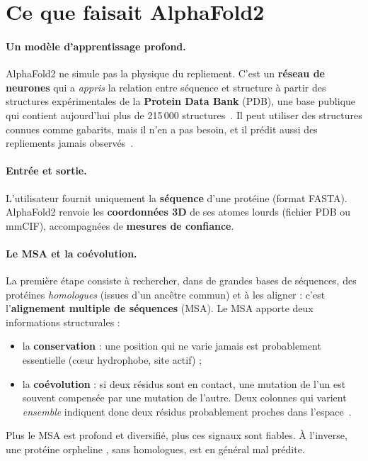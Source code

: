\section{Ce que faisait AlphaFold2}

\paragraph{Un modèle d'apprentissage profond.} AlphaFold2 ne simule pas la physique du repliement. C'est un \textbf{réseau de neurones} qui a \emph{appris} la relation entre séquence et structure à partir des structures expérimentales de la \textbf{Protein Data Bank} (PDB), une base publique qui contient aujourd'hui plus de 215\,000 structures~\cite{berman2000}. Il peut utiliser des structures connues comme gabarits, mais il n'en a pas besoin, et il prédit aussi des repliements jamais observés~\cite{ebi_course}.

\paragraph{Entrée et sortie.} L'utilisateur fournit uniquement la \textbf{séquence} d'une protéine (format FASTA). AlphaFold2 renvoie les \textbf{coordonnées 3D} de ses atomes lourds (fichier PDB ou mmCIF), accompagnées de \textbf{mesures de confiance}.

\paragraph{Le MSA et la coévolution.} La première étape consiste à rechercher, dans de grandes bases de séquences, des protéines \emph{homologues} (issues d'un ancêtre commun) et à les aligner : c'est l'\textbf{alignement multiple de séquences} (MSA). Le MSA apporte deux informations structurales :
\begin{itemize}
  \item la \textbf{conservation} : une position qui ne varie jamais est probablement essentielle (cœur hydrophobe, site actif) ;
  \item la \textbf{coévolution} : si deux résidus sont en contact, une mutation de l'un est souvent compensée par une mutation de l'autre. Deux colonnes qui varient \emph{ensemble} indiquent donc deux résidus probablement proches dans l'espace~\cite{ebi_course}.
\end{itemize}
Plus le MSA est profond et diversifié, plus ces signaux sont fiables. À l'inverse, une protéine \og orpheline \fg{}, sans homologues, est en général mal prédite.

